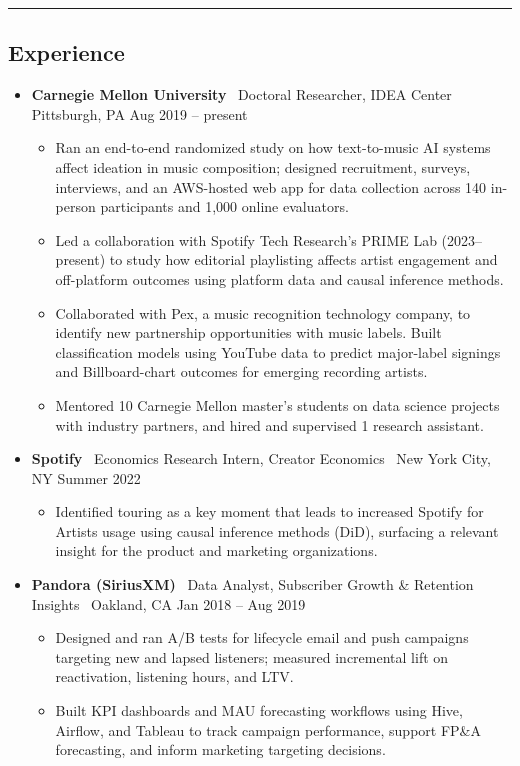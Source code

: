 \documentclass[10pt,letterpaper]{article}
\newcommand{\sep}{{\color{gray}\,\textbullet\,\,}}
\newcommand{\hsep}{\noindent\textcolor{gray}{\rule{\textwidth}{0.5pt}}}
\newcommand{\block}[1]{\begin{samepage}\hsep\subsection*{#1}\end{samepage}}
\begin{document}
\block{Experience}

\begin{itemize}[leftmargin=0pt, label={}, itemsep=4pt]
\item \textbf{Carnegie Mellon University} \sep Doctoral Researcher, IDEA Center \sep Pittsburgh, PA \hfill Aug 2019 -- present
  \begin{itemize}
  \item Ran an end-to-end randomized study on how text-to-music AI systems affect ideation in music composition; designed recruitment, surveys, interviews, and an AWS-hosted web app for data collection across 140 in-person participants and 1{,}000 online evaluators.
  \item Led a collaboration with Spotify Tech Research's PRIME Lab (2023--present) to study how editorial playlisting affects artist engagement and off-platform outcomes using platform data and causal inference methods.
  \item Collaborated with Pex, a music recognition technology company, to identify new partnership opportunities with music labels. Built classification models using YouTube data to predict major-label signings and Billboard-chart outcomes for emerging recording artists.
  \item Mentored 10 Carnegie Mellon master's students on data science projects with industry partners, and hired and supervised 1 research assistant.
  \end{itemize}
\item \textbf{Spotify} \sep Economics Research Intern, Creator Economics \sep New York City, NY \hfill Summer 2022
  \begin{itemize}
  \item Identified touring as a key moment that leads to increased Spotify for Artists usage using causal inference methods (DiD), surfacing a relevant insight for the product and marketing organizations.
  \end{itemize}
\item \textbf{Pandora (SiriusXM)} \sep Data Analyst, Subscriber Growth \& Retention Insights \sep Oakland, CA \hfill Jan 2018 -- Aug 2019
  \begin{itemize}
  \item Designed and ran A/B tests for lifecycle email and push campaigns targeting new and lapsed listeners; measured incremental lift on reactivation, listening hours, and LTV.
  \item Built KPI dashboards and MAU forecasting workflows using Hive, Airflow, and Tableau to track campaign performance, support FP\&A forecasting, and inform marketing targeting decisions.

\end{itemize}
\end{itemize}
\end{document}
